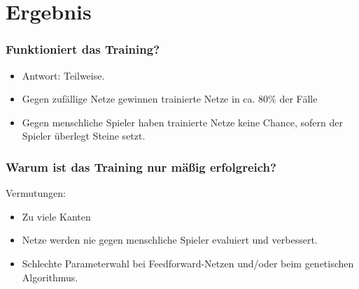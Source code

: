 \section{Ergebnis}

\begin{frame}
    \frametitle{Funktioniert das Training?}
    \begin{itemize}
    \item Antwort: Teilweise.
    \item Gegen zufällige Netze gewinnen trainierte Netze in ca. 80\% der Fälle
    \item Gegen menschliche Spieler haben trainierte Netze keine Chance, sofern der Spieler überlegt Steine setzt.
    \end{itemize}

\end{frame}
\begin{frame}
    \frametitle{Warum ist das Training nur mäßig erfolgreich?}
    Vermutungen: 
    \begin{itemize}
    \item Zu viele Kanten
    \item Netze werden nie gegen menschliche Spieler evaluiert und verbessert.
    \item Schlechte Parameterwahl bei Feedforward-Netzen und/oder beim genetischen Algorithmus.
    \end{itemize}

\end{frame}